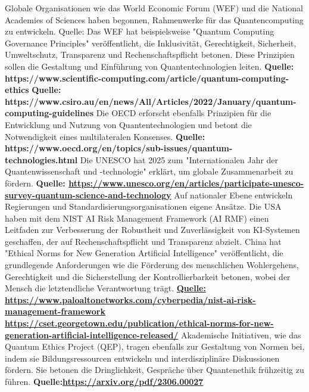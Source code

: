 Globale Organisationen wie das World Economic Forum (WEF) und die National Academies of Sciences haben begonnen, Rahmenwerke für das Quantencomputing zu entwickeln. Quelle: Das WEF hat beispielsweise "Quantum Computing Governance Principles" veröffentlicht, die Inklusivität, Gerechtigkeit, Sicherheit, Umweltschutz, Transparenz und Rechenschaftspflicht betonen. Diese Prinzipien sollen die Gestaltung und Einführung von Quantentechnologien leiten. \textbf{Quelle: https://www.scientific-computing.com/article/quantum-computing-ethics} \textbf{Quelle: https://www.csiro.au/en/news/All/Articles/2022/January/quantum-computing-guidelines} Die OECD erforscht ebenfalls Prinzipien für die Entwicklung und Nutzung von Quantentechnologien und betont die Notwendigkeit eines multilateralen Konsenses. \textbf{Quelle: }\textbf{https://www.oecd.org/en/topics/sub-issues/quantum-technologies.html} Die UNESCO hat 2025 zum "Internationalen Jahr der Quantenwissenschaft und -technologie" erklärt, um globale Zusammenarbeit zu fördern. \textbf{Quelle: \href{https://www.unesco.org/en/articles/participate-unesco-survey-quantum-science-and-technology}{https://www.unesco.org/en/articles/participate-unesco-survey-quantum-science-and-technology}
}
Auf nationaler Ebene entwickeln Regierungen und Standardisierungsorganisationen eigene Ansätze. Die USA haben mit dem NIST AI Risk Management Framework (AI RMF) einen Leitfaden zur Verbesserung der Robustheit und Zuverlässigkeit von KI-Systemen geschaffen, der auf Rechenschaftspflicht und Transparenz abzielt. China hat "Ethical Norms for New Generation Artificial Intelligence" veröffentlicht, die grundlegende Anforderungen wie die Förderung des menschlichen Wohlergehens, Gerechtigkeit und die Sicherstellung der Kontrollierbarkeit betonen, wobei der Mensch die letztendliche Verantwortung trägt.\textbf{ \href{https://www.paloaltonetworks.com/cyberpedia/nist-ai-risk-management-framework}{Quelle:  https://www.paloaltonetworks.com/cyberpedia/nist-ai-risk-management-framework} \href{https://cset.georgetown.edu/publication/ethical-norms-for-new-generation-artificial-intelligence-released/}{https://cset.georgetown.edu/publication/ethical-norms-for-new-generation-artificial-intelligence-released/}
}
Akademische Initiativen, wie das Quantum Ethics Project (QEP), tragen ebenfalls zur Gestaltung von Normen bei, indem sie Bildungsressourcen entwickeln und interdisziplinäre Diskussionen fördern. Sie betonen die Dringlichkeit, Gespräche über Quantenethik frühzeitig zu führen. \textbf{Quelle:\href{https://arxiv.org/pdf/2306.00027}{https://arxiv.org/pdf/2306.00027}}

